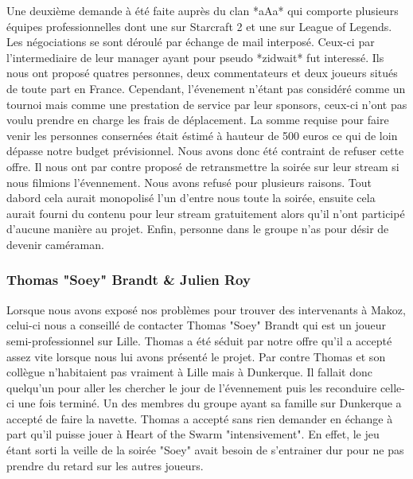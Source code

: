 Une deuxième demande à été faite auprès du clan *aAa* qui comporte
plusieurs équipes professionnelles dont une sur Starcraft 2 et une sur
League of Legends. Les négociations se sont déroulé par échange de mail
interposé.  Ceux-ci par l'intermediaire de leur manager ayant pour
pseudo *zidwait* fut interessé. Ils nous ont proposé quatres personnes,
deux commentateurs et deux joueurs situés de toute part en France.
Cependant, l'évenement n'étant pas considéré comme un tournoi mais comme
une prestation de service par leur sponsors, ceux-ci n'ont pas voulu
prendre en charge les frais de déplacement. La somme requise pour faire
venir les personnes consernées était éstimé à hauteur de 500 euros ce
qui de loin dépasse notre budget prévisionnel. Nous avons donc été
contraint de refuser cette offre. Il nous ont par contre proposé de
retransmettre la soirée sur leur stream si nous filmions l'évennement.
Nous avons refusé pour plusieurs raisons. Tout dabord cela aurait
monopolisé l'un d'entre nous toute la soirée, ensuite cela aurait fourni
du contenu pour leur stream gratuitement alors qu'il n'ont participé
d'aucune manière au projet. Enfin, personne dans le groupe n'as pour
désir de devenir caméraman.

\subsubsection{Thomas "Soey" Brandt \& Julien Roy}%
\label{ssub:tthomas_soey_brandt_&_julien_roy}

Lorsque nous avons exposé nos problèmes pour trouver des intervenants à
Makoz, celui-ci nous a conseillé de contacter Thomas "Soey" Brandt qui
est un joueur semi-professionnel sur Lille. Thomas a été séduit par
notre offre qu'il a accepté assez vite lorsque nous lui avons présenté
le projet. Par contre Thomas et son collègue n'habitaient pas vraiment à
Lille mais à Dunkerque. Il fallait donc quelqu'un pour aller les
chercher le jour de l'évennement puis les reconduire celle-ci une fois
terminé. Un des membres du groupe ayant sa famille sur Dunkerque a
accepté de faire la navette. Thomas a accepté sans rien demander en
échange à part qu'il puisse jouer à Heart of the Swarm "intensivement".
En effet, le jeu étant sorti la veille de la soirée "Soey" avait besoin
de s'entrainer dur pour ne pas prendre du retard sur les autres joueurs.


